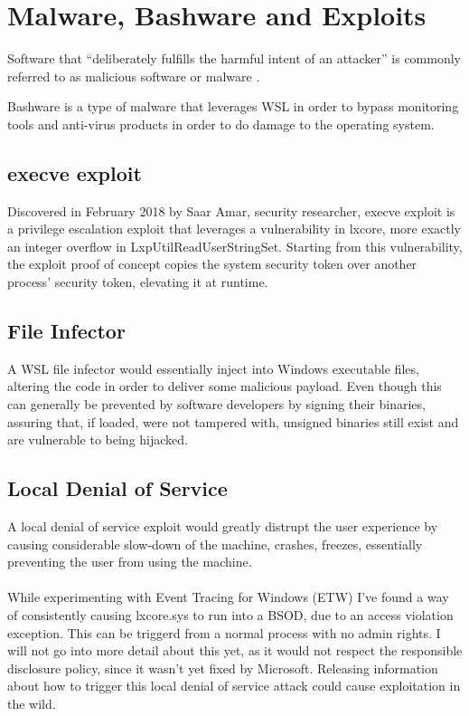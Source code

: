     \section{Malware, Bashware and Exploits}
        Software that “deliberately fulfills the harmful intent of an attacker” is commonly referred to as malicious software or malware
        \cite{ieeeproc2007}.

        Bashware is a type of malware that leverages WSL in order to bypass monitoring tools and anti-virus products in order to do damage to the
        operating system.
        
        \subsection{execve exploit}
            Discovered in February 2018 by Saar Amar, security researcher, execve exploit\cite{execve} is a privilege escalation exploit that
            leverages a vulnerability in lxcore, more exactly an integer overflow in LxpUtilReadUserStringSet. Starting from this vulnerability,
            the exploit proof of concept copies the system security token over another process' security token, elevating it at runtime.

        \subsection{File Infector}
            A WSL file infector would essentially inject into Windows executable files, altering the code in order to deliver some malicious
            payload. Even though this can generally be prevented by software developers by signing their binaries, assuring that, if loaded, were
            not tampered with, unsigned binaries still exist and are vulnerable to being hijacked.
            
        \subsection{Local Denial of Service}
            A local denial of service exploit would greatly distrupt the user experience by causing considerable slow-down of 
            the machine, crashes, freezes, essentially preventing the user from using the machine.

            \paragraph{}
            While experimenting with Event Tracing for Windows (ETW) I've found a way of consistently causing lxcore.sys to run into a BSOD, 
            due to an access violation exception. This can be triggerd from a normal process with no admin rights. I will not go into more 
            detail about this yet, as it would not respect the responsible disclosure policy, since it wasn't yet fixed by Microsoft. Releasing
            information about how to trigger this local denial of service attack could cause exploitation in the wild.

